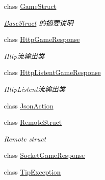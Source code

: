 \begin{DoxyCompactItemize}
class \mbox{\hyperlink{class_t_net_1_1_service_1_1_game_struct}{Game\+Struct}}
\begin{DoxyCompactList}\small\item\em \mbox{\hyperlink{class_t_net_1_1_service_1_1_base_struct}{Base\+Struct}} 的摘要说明 \end{DoxyCompactList}\item 
class \mbox{\hyperlink{class_t_net_1_1_service_1_1_http_game_response}{Http\+Game\+Response}}
\begin{DoxyCompactList}\small\item\em Http流输出类 \end{DoxyCompactList}\item 
class \mbox{\hyperlink{class_t_net_1_1_service_1_1_http_listent_game_response}{Http\+Listent\+Game\+Response}}
\begin{DoxyCompactList}\small\item\em Http\+Listent流输出类 \end{DoxyCompactList}\item 
class \mbox{\hyperlink{class_t_net_1_1_service_1_1_json_action}{Json\+Action}}
\item 
class \mbox{\hyperlink{class_t_net_1_1_service_1_1_remote_struct}{Remote\+Struct}}
\begin{DoxyCompactList}\small\item\em Remote struct \end{DoxyCompactList}\item 
class \mbox{\hyperlink{class_t_net_1_1_service_1_1_socket_game_response}{Socket\+Game\+Response}}
\item 
class \mbox{\hyperlink{class_t_net_1_1_service_1_1_tip_exception}{Tip\+Exception}}
\end{DoxyCompactItemize}
